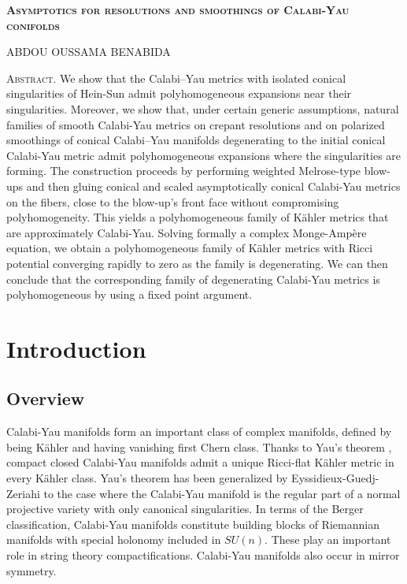 \documentclass[a4paper,11pt]{article}
\begin{document}
\begin{center}
\textsc{\textbf{\LARGE{Asymptotics for resolutions and smoothings of Calabi-Yau conifolds}}}
\end{center}

\begin{center}
\textsc{ABDOU OUSSAMA BENABIDA}
\end{center}

\noindent \textsc{Abstract.} We show that the Calabi–Yau metrics with isolated conical singularities of Hein-Sun \cite{hein_calabi-yau_2017} admit polyhomogeneous expansions near their singularities. Moreover, we show that, under certain generic assumptions, natural families of smooth Calabi-Yau metrics on crepant resolutions and on polarized smoothings of conical Calabi–Yau manifolds degenerating to the initial conical Calabi-Yau metric admit polyhomogeneous expansions where the singularities are forming. The construction proceeds by performing weighted Melrose-type blow-ups and then gluing conical and scaled asymptotically conical Calabi-Yau metrics on the fibers, close to the blow-up's front face without compromising polyhomogeneity. This yields a polyhomogeneous family of Kähler metrics that are approximately Calabi-Yau. Solving formally a complex Monge-Ampère equation, we obtain a polyhomogeneous family of Kähler metrics with Ricci potential converging rapidly to zero as the family is degenerating. We can then conclude that the corresponding family of degenerating Calabi-Yau metrics is polyhomogeneous by using a fixed point argument.


\vspace{1cm}






\tableofcontents
\newpage
\section{Introduction} 
\subsection{Overview}
Calabi-Yau manifolds form an important class of complex manifolds, defined by being Kähler and having vanishing first Chern class. Thanks to Yau's theorem \cite{yau_ricci_1978}, compact closed Calabi-Yau manifolds admit a unique Ricci-flat Kähler metric in every Kähler class. Yau's theorem has been generalized by Eyssidieux-Guedj-Zeriahi \cite{eyssidieux_singular_2009} to the case where the Calabi-Yau manifold is the regular part of a normal projective variety with only canonical singularities. In terms of the Berger classification, Calabi-Yau manifolds constitute building blocks of Riemannian manifolds with special holonomy included in $SU(n)$. These play an important role in string theory compactifications. Calabi-Yau manifolds also occur in mirror symmetry. \\
\end{document}
